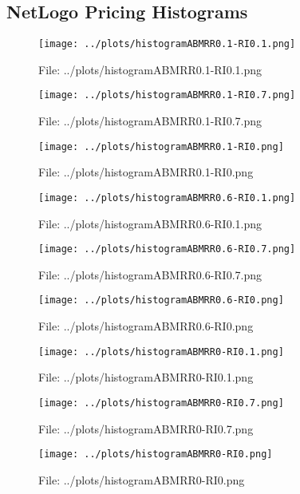 \documentclass[a4paper, 11pt]{report}
\let\Oldsubsection\subsection
\renewcommand{\subsection}{\FloatBarrier\Oldsubsection}
\begin{document}
\subsection{NetLogo Pricing Histograms}
\begin{figure}[h!] \caption{File: ../plots/histogramABMRR0.1-RI0.1.png} \texttt{[image: ../plots/histogramABMRR0.1-RI0.1.png]} \end{figure}
\begin{figure}[h!] \caption{File: ../plots/histogramABMRR0.1-RI0.7.png} \texttt{[image: ../plots/histogramABMRR0.1-RI0.7.png]} \end{figure}
\begin{figure}[h!] \caption{File: ../plots/histogramABMRR0.1-RI0.png} \texttt{[image: ../plots/histogramABMRR0.1-RI0.png]} \end{figure}
\begin{figure}[h!] \caption{File: ../plots/histogramABMRR0.6-RI0.1.png} \texttt{[image: ../plots/histogramABMRR0.6-RI0.1.png]} \end{figure}
\begin{figure}[h!] \caption{File: ../plots/histogramABMRR0.6-RI0.7.png} \texttt{[image: ../plots/histogramABMRR0.6-RI0.7.png]} \end{figure}
\begin{figure}[h!] \caption{File: ../plots/histogramABMRR0.6-RI0.png} \texttt{[image: ../plots/histogramABMRR0.6-RI0.png]} \end{figure}
\begin{figure}[h!] \caption{File: ../plots/histogramABMRR0-RI0.1.png} \texttt{[image: ../plots/histogramABMRR0-RI0.1.png]} \end{figure}
\begin{figure}[h!] \caption{File: ../plots/histogramABMRR0-RI0.7.png} \texttt{[image: ../plots/histogramABMRR0-RI0.7.png]} \end{figure}
\begin{figure}[h!] \caption{File: ../plots/histogramABMRR0-RI0.png} \texttt{[image: ../plots/histogramABMRR0-RI0.png]} \end{figure}
\end{document}
